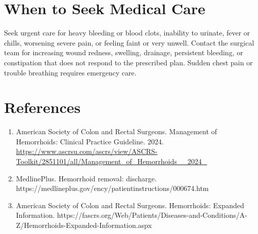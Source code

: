 \section*{When to Seek Medical Care}
Seek urgent care for heavy bleeding or blood clots, inability to urinate, fever or chills, worsening severe pain, or feeling faint or very unwell. Contact the surgical team for increasing wound redness, swelling, drainage, persistent bleeding, or constipation that does not respond to the prescribed plan. Sudden chest pain or trouble breathing requires emergency care.

\section*{References}
\begin{enumerate}
  \item American Society of Colon and Rectal Surgeons. Management of Hemorrhoids: Clinical Practice Guideline. 2024. \url{https://www.ascrsu.com/ascrs/view/ASCRS-Toolkit/2851101/all/Management_of_Hemorrhoids__2024_}
  \item MedlinePlus. Hemorrhoid removal: discharge. https://medlineplus.gov/ency/patientinstructions/000674.htm
  \item American Society of Colon and Rectal Surgeons. Hemorrhoids: Expanded Information. https://fascrs.org/Web/Patients/Diseases-and-Conditions/A-Z/Hemorrhoids-Expanded-Information.aspx
\end{enumerate}

\clearpage
